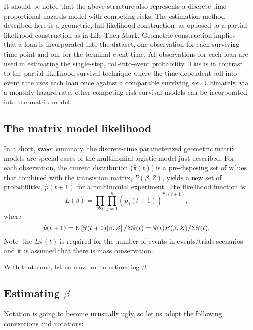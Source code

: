 \documentclass[10pt]{article}
\begin{document}
It should be noted that the above structure also represents a discrete-time proportional hazards model with competing risks.  The estimation method described here is a geometric, 
full likelihood construction, as opposed to a partial-likelihood construction as in Life-Then-Mark.  Geometric construction implies that a loan is incorporated into the dataset,
one observation for each surviving time point and one for the terminal event time.  All observations for each loan are used in estimating the single-step, roll-into-event probability.
This is in contrast to the partial-likelihood survival technique where the time-dependent roll-into-event rate uses each loan once against a comparable surviving set.
Ultimately, via a monthly hazard rate, other competing risk survival models can be incorporated into the matrix model.


\subsection{The matrix model likelihood}


In a short, sweet summary, the discrete-time parameterized geometric matrix models are special cases of the multinomial logistic model just described.  For each observation, the current
distribution ($\widehat{\pi}(t)$) is a pre-disposing set of values that combined with the transistion matrix, $P(\beta,Z)$, 
yields a new set of probabilities, $\widehat{p}(t+1)$ for a multinomial experiment.  The likelihood function is:
$$L(\beta)=\prod_{obs} \prod_{j=1}^n(\widehat{p}_j(t+1))^{\widehat{\pi}_j(t+1)},$$
where
$$\widehat{p}(t+1)=\text{E}\left[{{\widehat{\pi}(t+1)}|{\beta,Z}}\right]/\Sigma \widehat{\pi}(t) = \widehat{\pi}(t)P(\beta,Z)/\Sigma \widehat{\pi}(t) .$$
Note: the $\Sigma \widehat{\pi}(t)$ is required for the number of events in events/trials scenarios and it is assumed that there is mass conservation.

With that done, let us move on to estimating $\beta$.



\subsection{Estimating $\beta$}

Notation is going to become unusually ugly, so let us adopt the following conventions and notations:
\end{document}
